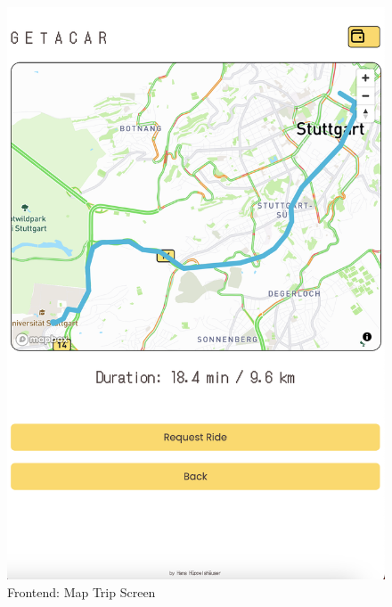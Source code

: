 \begin{figure}[H]
    \centering
    
    \begin{minipage}{0.45\linewidth}
        \centering
        \includegraphics[width=\linewidth]{data/ffss/3.png}
        \caption{Frontend: Map Trip Screen}
        \label{fig:MapTripScreen}
    \end{minipage}
    \hfill
    \begin{minipage}{0.45\linewidth}
        \centering

\end{minipage}
\end{figure}
